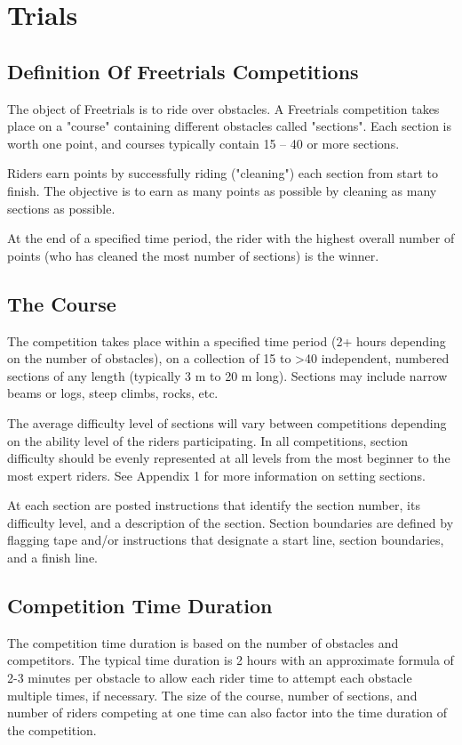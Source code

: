 \chapter{Trials}

\section{Definition Of Freetrials Competitions}
The object of Freetrials is to ride over obstacles. 
A Freetrials competition takes place on a "course" containing different obstacles called "sections". 
Each section is worth one point, and courses typically contain 15 – 40 or more sections.

Riders earn points by successfully riding ("cleaning") each section from start to finish. 
The objective is to earn as many points as possible by cleaning as many sections as possible.

At the end of a specified time period, the rider with the highest overall number of points (who has cleaned the most number of sections) is the winner.

\section{The Course}
The competition takes place within a specified time period (2+ hours depending on the number of obstacles), on a
collection of 15 to >40 independent, numbered sections of any length (typically 3 m to 20 m long). 
Sections may include narrow beams or logs, steep climbs, rocks, etc.

The average difficulty level of sections will vary between competitions depending on the ability level of the riders participating. 
In all competitions, section difficulty should be evenly represented at all levels from the most beginner to the most expert riders. 
See Appendix 1 for more information on setting sections.

At each section are posted instructions that identify the section number, its difficulty level, and a description of the section.
Section boundaries are defined by flagging tape and/or instructions that designate a start line, section boundaries, and a finish line.

\section{Competition Time Duration}
The competition time duration is based on the number of obstacles and competitors. 
The typical time duration is 2 hours with an approximate formula of 2-3 minutes per obstacle to allow each rider time to attempt each obstacle multiple times, if necessary. 
The size of the course, number of sections, and number of riders competing at one time can also factor into the time duration of the competition.

